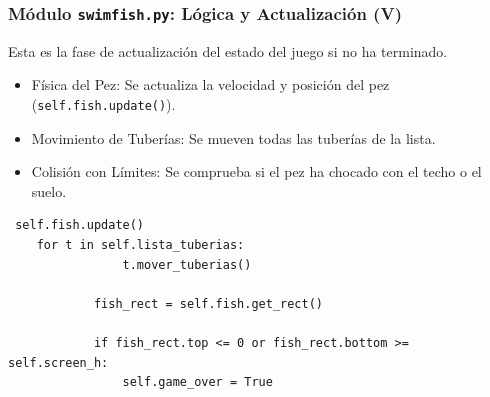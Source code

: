 \documentclass[
	11pt, %
]{beamer}
\begin{document}
\begin{frame}[fragile] \frametitle{Módulo \texttt{swimfish.py}: Lógica y Actualización (V)}

Esta es la fase de actualización del estado del juego si no ha terminado.

\begin{itemize} \item Física del Pez: Se actualiza la velocidad y posición del pez (\texttt{self.fish.update()}). \item Movimiento de Tuberías: Se mueven todas las tuberías de la lista. \item Colisión con Límites: Se comprueba si el pez ha chocado con el techo o el suelo. \end{itemize}

\vspace{4pt} {\scriptsize \begin{verbatim} self.fish.update()
    for t in self.lista_tuberias:
                t.mover_tuberias()

            fish_rect = self.fish.get_rect()

            if fish_rect.top <= 0 or fish_rect.bottom >= self.screen_h:
                self.game_over = True
\end{verbatim} } \end{frame}

\end{document}

